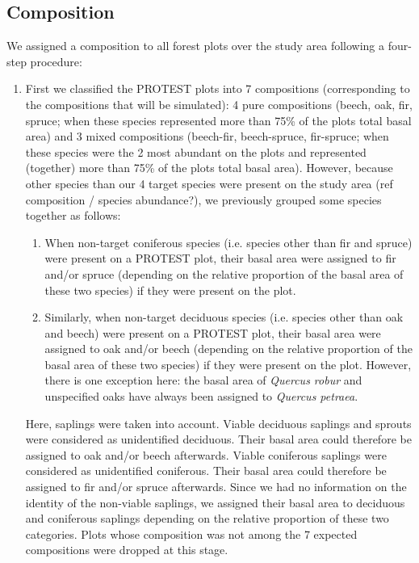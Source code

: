 \documentclass[a4paper]{article}
\begin{document}

\subsection*{Composition}

We assigned a composition to all forest plots over the study area following a four-step procedure:

\begin{enumerate}

    \item First we classified the PROTEST plots into 7 compositions (corresponding to the compositions that will be simulated): 4 pure compositions (beech, oak, fir, spruce; when these species represented more than 75\% of the plots total basal area) and 3 mixed compositions (beech-fir, beech-spruce, fir-spruce; when these species were the 2 most abundant on the plots and represented (together) more than 75\% of the plots total basal area). However, because other species than our 4 target species were present on the study area (ref composition / species abundance?), we previously grouped some species together as follows:

    \begin{enumerate}

        \item When non-target coniferous species (i.e. species other than fir and spruce) were present on a PROTEST plot, their basal area were assigned to fir and/or spruce (depending on the relative proportion of the basal area of these two species) if they were present on the plot.

        \item Similarly, when non-target deciduous species (i.e. species other than oak and beech) were present on a PROTEST plot, their basal area were assigned to oak and/or beech (depending on the relative proportion of the basal area of these two species) if they were present on the plot. However, there is one exception here: the basal area of \textit{Quercus robur} and unspecified oaks have always been assigned to \textit{Quercus petraea}.

    \end{enumerate}

    Here, saplings were taken into account. Viable deciduous saplings and sprouts were considered as unidentified deciduous. Their basal area could therefore be assigned to oak and/or beech afterwards. Viable coniferous saplings were considered as unidentified coniferous. Their basal area could therefore be assigned to fir and/or spruce afterwards. Since we had no information on the identity of the non-viable saplings, we assigned their basal area to deciduous and coniferous saplings depending on the relative proportion of these two categories. Plots whose composition was not among the 7 expected compositions were dropped at this stage.


\end{enumerate}
\end{document}
